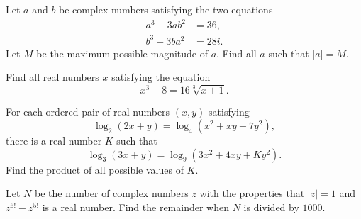 \begin{question}[name={2017 HMMT, November Guts, \href{https://artofproblemsolving.com/community/c129h1387210p7718352}{Problem 16}}]
	Let $a$ and $b$ be complex numbers satisfying the two equations
	\begin{align*}
		a^3 - 3ab^2 & = 36, \\
		b^3 - 3ba^2 & = 28i.
	\end{align*}Let $M$ be the maximum possible magnitude of $a$. Find all $a$ such that $|a| = M$.
\end{question}






\begin{question}[name={2017 HMMT, November Guts, \href{https://artofproblemsolving.com/community/c129h1387220p7718379}{Problem 25}}]
	Find all real numbers $x$ satisfying the equation $$x^3 - 8 = 16 \sqrt[3]{x + 1}.$$
\end{question}







\begin{question}[name={2018 AIME I, \href{https://artofproblemsolving.com/community/c4p9995689}{Problem 5}}]
	For each ordered pair of real numbers $(x,y)$ satisfying
	\[ \log_2(2x+y) = \log_4(x^2+xy+7y^2), \]there is a real number $K$ such that
	\[ \log_3(3x+y) = \log_9(3x^2+4xy+Ky^2). \]Find the product of all possible values of $K$.
\end{question}


%	













\begin{question}[name={2018 AIME I, \href{https://artofproblemsolving.com/community/c4p9995336}{Problem 6}}]
	Let $N$ be the number of complex numbers $z$ with the properties that $|z|=1$ and $z^{6!}-z^{5!}$ is a real number. Find the remainder when $N$ is divided by $1000$.
\end{question}


%	






